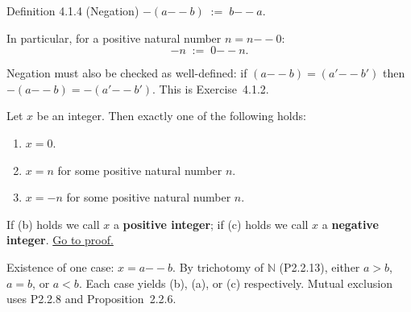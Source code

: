 \begin{propositionbox}{Definition 4.1.4 (Negation)}
$-(a {-\!\!-} b) \;:=\; b {-\!\!-} a$.

In particular, for a positive natural number $n = n {-\!\!-} 0$:
\[
-n \;:=\; 0 {-\!\!-} n.
\]
\end{propositionbox}

\begin{remark*}
Negation must also be checked as well-defined: if
$(a {-\!\!-} b) = (a' {-\!\!-} b')$ then $-(a {-\!\!-} b) = -(a' {-\!\!-} b')$.
This is Exercise~4.1.2.
\end{remark*}

\begin{lemma}
\label{lem:int-trichotomy}
Let $x$ be an integer. Then exactly one of the following holds:
\begin{enumerate}
  \item[(a)] $x = 0$.
  \item[(b)] $x = n$ for some positive natural number $n$.
  \item[(c)] $x = -n$ for some positive natural number $n$.
\end{enumerate}
If (b) holds we call $x$ a \textbf{positive integer};
if (c) holds we call $x$ a \textbf{negative integer}.
\hyperref[prf:int-trichotomy]{Go to proof.}
\end{lemma}

\begin{remark*}
Existence of one case: $x = a {-\!\!-} b$.
By trichotomy of $\mathbb{N}$ (P2.2.13), either $a > b$, $a = b$,
or $a < b$.
Each case yields (b), (a), or (c) respectively.
Mutual exclusion uses P2.2.8 and Proposition~2.2.6.
\end{remark*}

